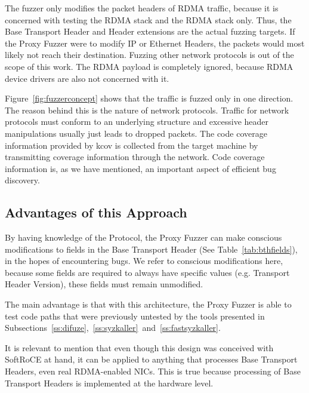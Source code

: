 The fuzzer only modifies the packet headers of RDMA traffic, because it is concerned
with testing the RDMA stack and the RDMA stack only. Thus, the Base Transport Header and Header extensions
are the actual fuzzing targets.  If the Proxy Fuzzer were to modify IP or Ethernet Headers,
the packets would most likely not reach their destination. Fuzzing other
network protocols is out of the scope of this work. The RDMA payload is completely ignored,
because RDMA device drivers are also not concerned with it. %

Figure~\ref{fig:fuzzerconcept} shows that the traffic is fuzzed only in one direction. The reason
behind this is the nature of network protocols. Traffic for network protocols must conform to an underlying
structure and excessive header manipulations usually just leads to dropped packets. The code coverage information provided by
kcov is collected from the target machine by transmitting coverage information through the network. Code
coverage information is, as we have mentioned, an important aspect of efficient bug discovery.

\subsection{Advantages of this Approach}

By having knowledge of the Protocol, the Proxy Fuzzer can make conscious modifications to fields in the Base Transport
Header (See Table~\ref{tab:bthfields}), in the hopes of encountering bugs. We refer to conscious modifications here,
because some fields are required to always have specific values (e.g. Transport Header Version), these fields must remain unmodified.

The main advantage is that with this architecture, the Proxy Fuzzer is able to test code paths
that were previously untested by the tools presented in Subsections~\ref{ss:difuze},~\ref{ss:syzkaller}~and~\ref{ss:fastsyzkaller}.

It is relevant to mention that even though this design was conceived with
SoftRoCE at hand, it can be applied to anything that processes Base
Transport Headers, even real RDMA-enabled NICs. This is true because processing of
Base Transport Headers is implemented at the hardware level.



